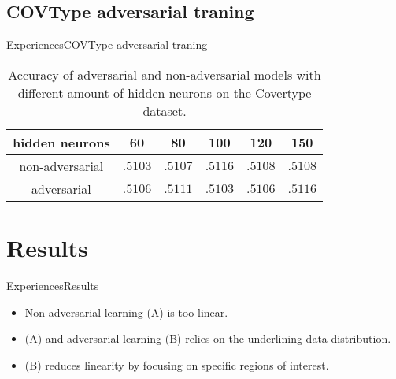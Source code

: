 \documentclass[10pt]{beamer}
\begin{document}
\subsection{COVType adversarial traning}
\begin{frame}{Experiences}{COVType adversarial traning}
  \pause
  \begin{table}[ht]
    \centering
    \begin{tabular}{c||c|c|c|c|c}
      hidden neurons & 60 & 80 & 100 & 120 & 150 \\
      \hline
      non-adversarial & $.5103$ & $.5107$ & $.5116$ & $.5108$ & $.5108$ \\
      adversarial     & $.5106$ & $.5111$ & $.5103$ & $.5106$ & $.5116$ \\
    \end{tabular}
    \caption{Accuracy of adversarial and non-adversarial models with different amount of hidden neurons on the Covertype dataset.}
    \label{tab:cov_acc}
  \end{table}
\end{frame}

  \section{Results}
  \begin{frame}{Experiences}{Results}
    \pause
    \begin{itemize}
      \item<2-> Non-adversarial-learning (A) is too linear.
      \item<2-> (A) and adversarial-learning (B) relies on the underlining data distribution.
      \item<3-> (B) reduces linearity by focusing on specific regions of interest.
    \end{itemize}
  \end{frame}



{\aauwavesbg
\begin{frame}
\end{frame}}
\end{document}

